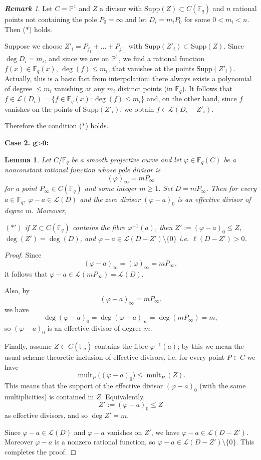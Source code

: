 \documentclass[14pt]{amsart}
\theoremstyle{plain}
\newtheorem{lem}[thm]{\bf Lemma}
\theoremstyle{definition}
\theoremstyle{remark}
\newtheorem{rem}[thm]{\bf Remark}
\theoremstyle{example}
\def \P{\mathbb{P}}
\def \F{\mathbb{F}}
\def \L{\mathcal{L}}
\def \Supp{\mathrm{Supp}}
\begin{document}
\begin{rem}
\label{example_curves}
Let $C=\P^1$ and $Z$ a divisor with $\Supp(Z)\subset C(\F_q)$ and $n$ rational points not containing the pole $P_0=\infty$ and let $D_i=m_iP_0$ for some $0<m_i<n$. Then ($*$) holds.

Suppose we choose $Z'_i=P_{j_1}+\ldots+P_{j_{m_i}}$ with $\Supp(Z'_i)\subset\Supp(Z)$. Since $\deg D_i=m_i$, and since we are on $\P^1$, we find a rational function $f(x)\in \F_q(x)$, $\deg(f)\leq m_i$, that vanishes at the points $\Supp(Z'_i)$. Actually, this is a basic fact from interpolation: there always exists a polynomial of degree $\leq m_i$ vanishing at any $m_i$ distinct points (in $\F_q$). It follows that $f\in\L(D_i)=\{f\in\F_q(x):\deg(f)\leq m_i\}$ and, on the other hand, since $f$ vanishes on the points of $\Supp(Z'_i)$, we obtain $f\in\L(D_i-Z'_i)$. 

Therefore the condition ($*$) holds.
\end{rem}

\noindent\textbf{Case 2. $\textbf{g>0}$:} 

\begin{lem}
Let $C/\F_{q}$ be a smooth projective curve and let 
$\varphi\in\F_{q}(C)$ be a nonconstant rational function whose pole divisor
is
$$
(\varphi)_\infty = mP_\infty
$$
for a point $P_\infty\in C(\F_{q})$ and some integer $m\ge 1$.
Set $D=mP_\infty$. Then for every $a\in\F_{q}$, $\varphi-a \in \mathcal L(D)$ and the zero divisor $(\varphi-a)_0$ is an effective divisor of degree $m$. Moreover, 

\begin{center}
$(*')$ if $Z\subset C(\F_{q})$ contains the fibre $\varphi^{-1}(a)$, then $Z':=(\varphi-a)_0\le Z$, $\deg(Z')=\deg(D)$, and
$\varphi-a\in\L(D-Z')\setminus\{0\}$ i.e. $\ell(D-Z')>0$.
\end{center}
\end{lem}

\begin{proof}
Since
$$
(\varphi-a)_\infty=(\varphi)_\infty = mP_\infty,
$$
it follows that $\varphi-a\in\mathcal L(mP_\infty)=\mathcal L(D)$.

Also, by
$$
(\varphi-a)_\infty = mP_\infty.
$$
we have
$$
\deg (\varphi-a)_0=\deg (\varphi-a)_\infty =\deg(mP_\infty)=m,
$$
so $(\varphi-a)_0$ is an effective divisor of degree $m$.

Finally, assume $Z\subset C(\F_{q})$ contains the fibre $\varphi^{-1}(a)$; by this we mean the usual scheme-theoretic inclusion of
effective divisors, i.e. for every point $P\in C$ we have
$$
\operatorname{mult}_P\big((\varphi-a)_0\big) \le \operatorname{mult}_P(Z).
$$
This means that the support of the effective divisor $(\varphi-a)_0$ (with the same
multiplicities) is contained in $Z$. Equivalently,
$$
Z':=(\varphi-a)_0\leq Z
$$
as effective divisors, and so $\deg Z'=m$.

Since $\varphi-a\in\mathcal L(D)$ and $\varphi-a$ vanishes on $Z'$, we
have $\varphi-a\in\mathcal L(D-Z')$. Moreover $\varphi-a$ is a nonzero
rational function, so $\varphi-a\in\mathcal L(D-Z')\setminus\{0\}$. This completes the proof.
\end{proof}
\end{document}
